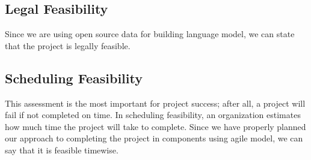 \subsection{Legal Feasibility}
Since we are using open source data for building language model, we can state that the project is legally feasible.

\subsection{Scheduling Feasibility}
This assessment is the most important for project success; after all, a project will fail if not completed on time. In scheduling feasibility, an organization estimates how much time the project will take to complete. Since we have properly planned our approach to completing the project in components using agile model, we can say that it is feasible timewise.
